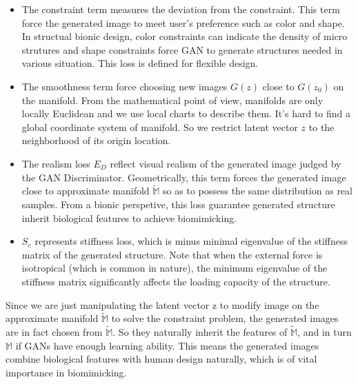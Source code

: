 \begin{itemize}
\item The constraint term measures the deviation from the constraint. This term force the generated image to meet user's preference such as color and shape. In structual bionic design, color constraints can indicate the density of micro strutures and shape constraints force GAN to generate structures needed in various situation. This loss is defined for flexible design.

\item The smoothness term force choosing new images $G(z)$ close to $G(z_0)$ on the manifold. From the mathematical point of view, manifolds are only locally Euclidean and we use local charts to describe them. It's hard to find a global coordinate system of manifold. So we restrict latent vector $z$ to the neighborhood of its origin location. 

\item The realism loss $E_D$ reflect visual realism of the generated image judged by the GAN Discriminator. Geometrically, this term forces the generated image close to approximate manifold $\widetilde{\mathbb{M}}$ so as to possess the same distribution as real samples. From a bionic perspetive, this loss guarantee generated structure inherit biological features to achieve biomimicking.  

\item $S_{e}$ represents stiffness loss, which is minus minimal eigenvalue of the stiffness matrix of the generated structure. Note that when the external force is isotropical (which is common in nature), the minimum eigenvalue of the stiffness matrix significantly affects the loading capacity of the structure.
\end{itemize}

Since we are just manipulating the latent vector z to modify image on the approximate manifold $\widetilde{\mathbb{M}}$ to solve the constraint problem, the generated images are in fact chosen from $\widetilde{\mathbb{M}}$. So they naturally inherit the features of $\widetilde{\mathbb{M}}$, and in turn $\mathbb{M}$ if GANs have enough learning ability. This means the generated images combine biological features with human design naturally, which is of vital importance in biomimicking. 

